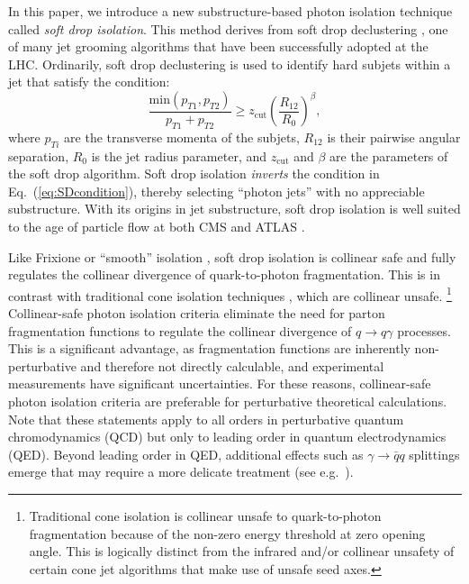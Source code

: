 \documentclass[a4paper,11pt]{article}
\DeclareRobustCommand{\Eq}[1]{Eq.~(\ref{#1})}
\begin{document}
In this paper, we introduce a new substructure-based photon isolation technique called \emph{soft drop isolation}.
%
This method derives from soft drop declustering \cite{Larkoski:2014wba}, one of many jet grooming algorithms \cite{Butterworth:2008iy,Ellis:2009su,Ellis:2009me,Krohn:2009th,Dasgupta:2013ihk} that have been successfully adopted at the LHC.
%
Ordinarily, soft drop declustering is used to identify hard subjets within a jet that satisfy the condition:
%
\begin{equation}
\label{eq:SDcondition}
    \frac{\text{min}\left(p_{T1},p_{T2}\right)}{p_{T1} + p_{T2}} \geq z_{\text{cut}} \left(\frac{R_{12}}{R_0}\right)^{\beta},
\end{equation}
%
where $p_{Ti}$ are the transverse momenta of the subjets, $R_{12}$ is their pairwise angular separation, $R_0$ is the jet radius parameter, and $z_{\text{cut}}$ and $\beta$ are the parameters of the soft drop algorithm.
%
Soft drop isolation \emph{inverts} the condition in \Eq{eq:SDcondition}, thereby selecting ``photon jets'' with no appreciable substructure.
%
With its origins in jet substructure, soft drop isolation is well suited to the age of particle flow at both CMS \cite{Sirunyan:2017ulk} and ATLAS  \cite{Aaboud:2017aca}.

Like Frixione or ``smooth'' isolation \cite{Frixione:1998jh}, soft drop isolation is collinear safe and fully regulates the collinear divergence of quark-to-photon fragmentation. 
%
This is in contrast with traditional cone isolation techniques \cite{Baer:1990ra, Berger:1990et, Kramer:1991yc, Kunszt:1992np, Glover:1992he}, which are collinear unsafe.%
\footnote{Traditional cone isolation is collinear unsafe to quark-to-photon fragmentation because of the non-zero energy threshold at zero opening angle.
%
This is logically distinct from the infrared and/or collinear unsafety of certain cone jet algorithms that make use of unsafe seed axes.}
%
Collinear-safe photon isolation criteria eliminate the need for parton fragmentation functions \cite{Koller:1978kq, Laermann:1982jr} to regulate the collinear divergence of $q \rightarrow q \gamma$ processes.
%
This is a significant advantage, as fragmentation functions are inherently non-perturbative and therefore not directly calculable, and experimental measurements \cite{Glover:1993xc, Buskulic:1995au,GehrmannDeRidder:1997wx, Ackerstaff:1997nha, Bourhis:1997yu, Bourhis:2000gs} have significant uncertainties.
%
For these reasons, collinear-safe photon isolation criteria are preferable for perturbative theoretical calculations.
%
Note that these statements apply to all orders in perturbative quantum chromodynamics (QCD) but only to leading order in quantum electrodynamics (QED).
%
Beyond leading order in QED, additional effects such as $\gamma \rightarrow \bar{q} q$ splittings emerge that may require a more delicate treatment (see e.g.~\cite{Frederix:2016ost}).
\end{document}
